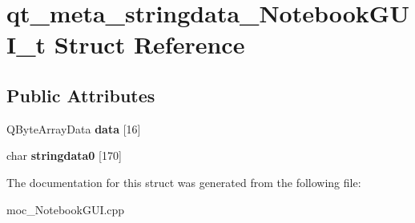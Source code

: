 \hypertarget{structqt__meta__stringdata__NotebookGUI__t}{}\section{qt\+\_\+meta\+\_\+stringdata\+\_\+\+Notebook\+G\+U\+I\+\_\+t Struct Reference}
\label{structqt__meta__stringdata__NotebookGUI__t}
\subsection*{Public Attributes}
\begin{DoxyCompactItemize}
\item 
\mbox{\label{structqt__meta__stringdata__NotebookGUI__t_ac1e5bd12bc64dcc34c29c0d466905d4f}} 
Q\+Byte\+Array\+Data {\bfseries data} \mbox{[}16\mbox{]}
\item 
\mbox{\label{structqt__meta__stringdata__NotebookGUI__t_abea86eea86dfb716c21340a08e8c7dfc}} 
char {\bfseries stringdata0} \mbox{[}170\mbox{]}
\end{DoxyCompactItemize}


The documentation for this struct was generated from the following file\+:\begin{DoxyCompactItemize}
\item 
moc\+\_\+\+Notebook\+G\+U\+I.\+cpp\end{DoxyCompactItemize}
